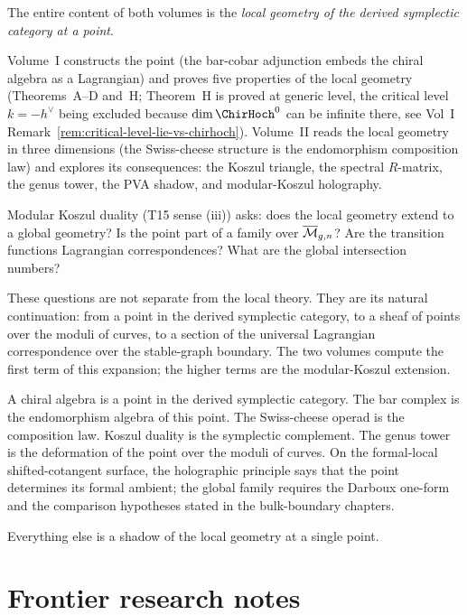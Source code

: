 \begin{remark}
\label{rem:local-geometry}
The entire content of both volumes is the \emph{local geometry of
the derived symplectic category at a point}.

Volume~I constructs the point (the bar-cobar adjunction embeds the
chiral algebra as a Lagrangian) and proves five properties of the
local geometry (Theorems~A--D and~H; Theorem~H is proved at generic level,
the critical level $k = -h^\vee$ being excluded because
$\dim \ChirHoch^0$ can be infinite there, see Vol~I
Remark~\ref*{rem:critical-level-lie-vs-chirhoch}). Volume~II reads the local geometry
in three dimensions (the Swiss-cheese structure is the endomorphism
composition law) and explores its consequences: the Koszul triangle,
the spectral $R$-matrix, the genus tower, the PVA shadow, and
modular-Koszul holography.

Modular Koszul duality (T15 sense (iii)) asks: does the local geometry extend to a
global geometry? Is the point part of a family over $\overline{\mathcal M}_{g,n}$?
Are the transition functions Lagrangian correspondences? What are
the global intersection numbers?

These questions are not separate from the local theory. They are
its natural continuation: from a point in the derived symplectic
category, to a sheaf of points over the moduli of curves, to a
section of the universal Lagrangian correspondence over the
stable-graph boundary. The two volumes compute the first term of
this expansion; the higher terms are the modular-Koszul extension.
\end{remark}

\bigskip

A chiral algebra is a point in the derived symplectic category.
The bar complex is the endomorphism algebra of this point.
The Swiss-cheese operad is the composition law. Koszul duality is
the symplectic complement. The genus tower is the deformation of
the point over the moduli of curves. On the formal-local
shifted-cotangent surface, the holographic principle says that the
point determines its formal ambient; the global family requires the
Darboux one-form and the comparison hypotheses stated in the
bulk-boundary chapters.

Everything else is a shadow of the local geometry at a single point.

\section{Frontier research notes}
\label{sec:vol2-frontier-research-notes}


